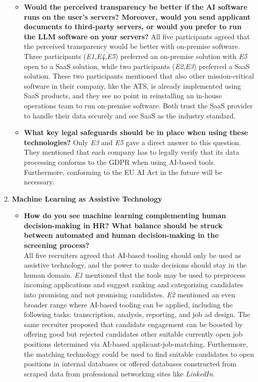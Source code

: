 \documentclass[draft,final]{thesisclass} %
\begin{document}
\begin{enumerate}
\begin{itemize}
        \item \textbf{Would the perceived transparency be better if the \acs{AI} software runs on the user's servers? Moreover, would you send applicant documents to third-party servers, or would you prefer to run the \gls{LLM} software on your servers?}
        All five participants agreed that the perceived transparency would be better with on-premise software.
        Three participants (\textit{E1},\textit{E4},\textit{E5}) preferred an on-premise solution with \textit{E5} open to a \acs{SaaS} solution, while two participants (\textit{E2},\textit{E3}) preferred a \acs{SaaS} solution.
        These two participants mentioned that also other mission-critical software in their company, like the \acs{ATS}, is already implemented using \acs{SaaS} products, and they see no point in reinstalling an in-house operations team to run on-premise software.
        Both trust the \acs{SaaS} provider to handle their data securely and see \acs{SaaS} as the industry standard.
        \item \textbf{What key legal safeguards should be in place when using these technologies?}
        Only \textit{E3} and \textit{E5} gave a direct answer to this question. They mentioned that each company has to legally verify that its data processing conforms to the \acs{GDPR} when using \acs{AI}-based tools. Furthermore, conforming to the \acs{EU AI Act} in the future will be necessary.
    \end{itemize}
    \item \textbf{Machine Learning as Assistive Technology}
    \begin{itemize}
        \item \textbf{How do you see machine learning complementing human decision-making in \acs{HR}? What balance should be struck between automated and human decision-making in the screening process?}\\
        All five recruiters agreed that \acs{AI}-based tooling should only be used as assistive technology, and the power to make decisions should stay in the human domain. \textit{E1} mentioned that the tools may be used to preprocess incoming applications and suggest ranking and categorizing candidates into promising and not promising candidates. \textit{E2} mentioned an even broader range where \acs{AI}-based tooling can be applied, including the following tasks: transcription, analysis, reporting, and job ad design. The same recruiter proposed that candidate engagement can be boosted by offering good but rejected candidates other suitable currently open job positions determined via \acs{AI}-based applicant-job-matching. Furthermore, the matching technology could be used to find suitable candidates to open positions in internal databases or offered databases constructed from scraped data from professional networking sites like \textit{LinkedIn}.

\end{itemize}
\end{enumerate}
\end{document}
